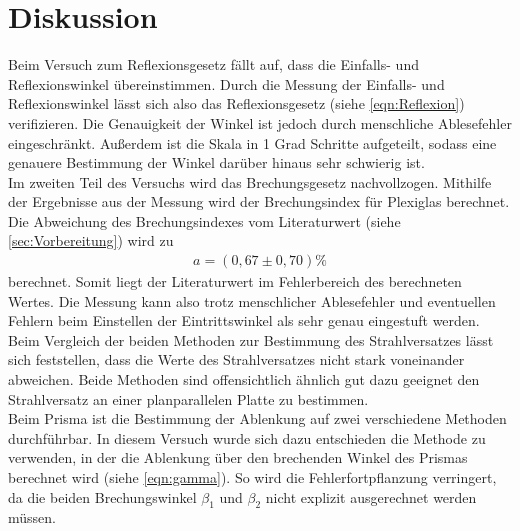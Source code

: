 \section{Diskussion}
\label{sec:Diskussion}

Beim Versuch zum Reflexionsgesetz fällt auf, dass die Einfalls- und Reflexionswinkel übereinstimmen.
Durch die Messung der Einfalls- und Reflexionswinkel lässt sich also das Reflexionsgesetz (siehe \autoref{eqn:Reflexion}) verifizieren.
Die Genauigkeit der Winkel ist jedoch durch menschliche Ablesefehler eingeschränkt. Außerdem ist die Skala in 1 Grad Schritte aufgeteilt,
sodass eine genauere Bestimmung der Winkel darüber hinaus sehr schwierig ist.\\


Im zweiten Teil des Versuchs wird das Brechungsgesetz nachvollzogen. Mithilfe der Ergebnisse aus der Messung wird der Brechungsindex
für Plexiglas berechnet. 
Die Abweichung des Brechungsindexes vom Literaturwert (siehe \autoref{sec:Vorbereitung}) wird zu
\begin{align*}
  a=(0,67 \pm 0,70) \si{\percent}
\end{align*}
berechnet. Somit liegt der Literaturwert im Fehlerbereich des berechneten Wertes. Die Messung kann also trotz menschlicher Ablesefehler
und eventuellen Fehlern beim Einstellen der Eintrittswinkel als sehr genau eingestuft werden.\\

Beim Vergleich der beiden Methoden zur Bestimmung des Strahlversatzes lässt sich feststellen, dass die Werte des
Strahlversatzes nicht stark voneinander abweichen. Beide Methoden sind offensichtlich ähnlich gut dazu geeignet den Strahlversatz 
an einer planparallelen Platte zu bestimmen.\\


Beim Prisma ist die Bestimmung der Ablenkung auf zwei verschiedene Methoden durchführbar.
In diesem Versuch wurde sich dazu entschieden die Methode zu verwenden,
in der die Ablenkung über den brechenden Winkel des Prismas berechnet wird (siehe \autoref{eqn:gamma}).
So wird die Fehlerfortpflanzung verringert, da die beiden Brechungswinkel $\beta_1$ und $\beta_2$ nicht
explizit ausgerechnet werden müssen.\\

